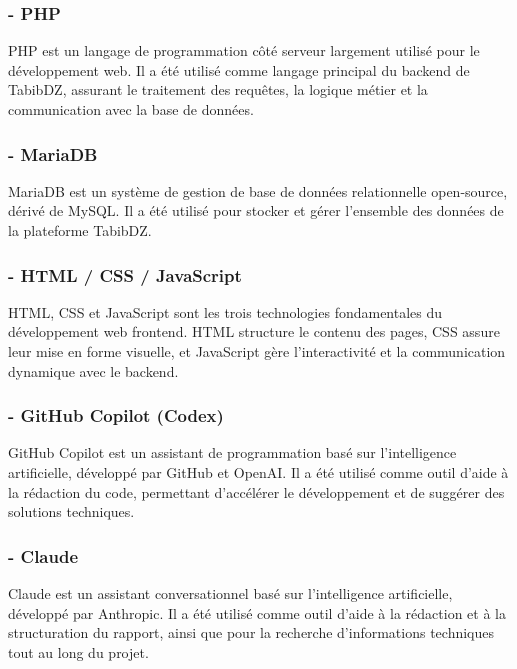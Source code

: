 \documentclass[12pt,a4paper]{report}
\begin{document}
\subsubsection*{- PHP}

PHP est un langage de programmation c\^ot\'e serveur largement utilis\'e pour le d\'eveloppement web. Il a \'et\'e utilis\'e comme langage principal du backend de TabibDZ, assurant le traitement des requ\^etes, la logique m\'etier et la communication avec la base de donn\'ees.

\subsubsection*{- MariaDB}

MariaDB est un syst\`eme de gestion de base de donn\'ees relationnelle open-source, d\'eriv\'e de MySQL. Il a \'et\'e utilis\'e pour stocker et g\'erer l'ensemble des donn\'ees de la plateforme TabibDZ.

\subsubsection*{- HTML / CSS / JavaScript}

HTML, CSS et JavaScript sont les trois technologies fondamentales du d\'eveloppement web frontend. HTML structure le contenu des pages, CSS assure leur mise en forme visuelle, et JavaScript g\`ere l'interactivit\'e et la communication dynamique avec le backend.

\subsubsection*{- GitHub Copilot (Codex)}

GitHub Copilot est un assistant de programmation bas\'e sur l'intelligence artificielle, d\'evelopp\'e par GitHub et OpenAI. Il a \'et\'e utilis\'e comme outil d'aide \`a la r\'edaction du code, permettant d'acc\'el\'erer le d\'eveloppement et de sugg\'erer des solutions techniques.

\subsubsection*{- Claude}

Claude est un assistant conversationnel bas\'e sur l'intelligence artificielle, d\'evelopp\'e par Anthropic. Il a \'et\'e utilis\'e comme outil d'aide \`a la r\'edaction et \`a la structuration du rapport, ainsi que pour la recherche d'informations techniques tout au long du projet.
\end{document}
